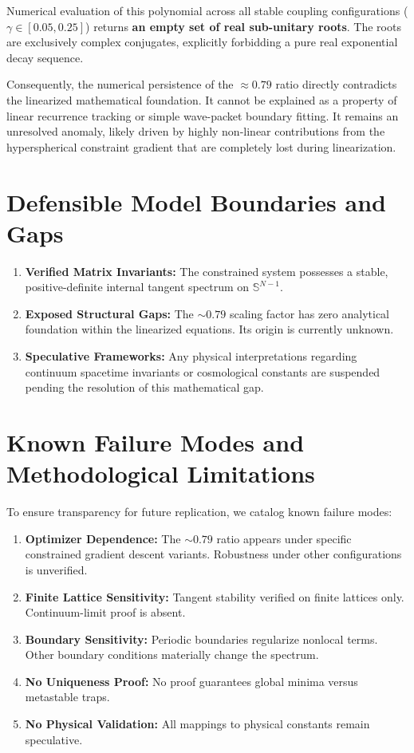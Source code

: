 \documentclass[11pt,a4paper]{article}
\begin{document}
Numerical evaluation of this polynomial across all stable coupling configurations ($\gamma \in [0.05, 0.25]$) returns \textbf{an empty set of real sub-unitary roots}. The roots are exclusively complex conjugates, explicitly forbidding a pure real exponential decay sequence. 

Consequently, the numerical persistence of the $\approx 0.79$ ratio directly contradicts the linearized mathematical foundation. It cannot be explained as a property of linear recurrence tracking or simple wave-packet boundary fitting. It remains an unresolved anomaly, likely driven by highly non-linear contributions from the hyperspherical constraint gradient that are completely lost during linearization.

\section{Defensible Model Boundaries and Gaps}
\begin{enumerate}
    \item \textbf{Verified Matrix Invariants:} The constrained system possesses a stable, positive-definite internal tangent spectrum on $\mathbb{S}^{N-1}$.
    \item \textbf{Exposed Structural Gaps:} The $\sim 0.79$ scaling factor has zero analytical foundation within the linearized equations. Its origin is currently unknown.
    \item \textbf{Speculative Frameworks:} Any physical interpretations regarding continuum spacetime invariants or cosmological constants are suspended pending the resolution of this mathematical gap.
\end{enumerate}


\section{Known Failure Modes and Methodological Limitations}
To ensure transparency for future replication, we catalog known failure modes:
\begin{enumerate}
    \item \textbf{Optimizer Dependence:} The $\sim 0.79$ ratio appears under specific constrained gradient descent variants. Robustness under other configurations is unverified.
    \item \textbf{Finite Lattice Sensitivity:} Tangent stability verified on finite lattices only. Continuum-limit proof is absent.
    \item \textbf{Boundary Sensitivity:} Periodic boundaries regularize nonlocal terms. Other boundary conditions materially change the spectrum.
    \item \textbf{No Uniqueness Proof:} No proof guarantees global minima versus metastable traps.
    \item \textbf{No Physical Validation:} All mappings to physical constants remain speculative.
\end{enumerate}
\end{document}
